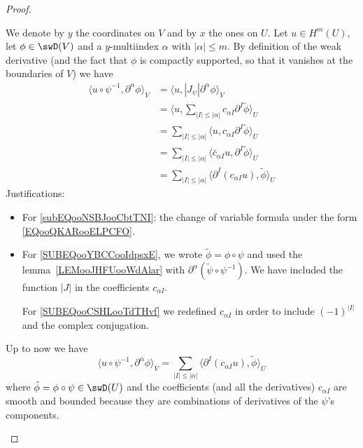 \begin{proof}
\begin{subproof}
		We denote by \( y\) the coordinates on \( V\) and by \( x\) the ones on \( U\). Let \( u\in H^m(U)\), let \( \phi\in\swD(V)\) and a \( y\)-multiindex \( \alpha\) with \( | \alpha |\leq m\). By definition of the weak derivative (and the fact that \( \phi\) is compactly supported, so that it vanishes at the boundaries of \( V\)) we have
		\begin{subequations}
			\begin{align}
				\langle u\circ\psi^{-1}, \partial^{\alpha}\phi\rangle_V & =\langle u, | J_{\psi}| \partial^{\alpha}\phi \rangle_V   \label{subEQooNSBJooCbtTNI}                                 \\
				                                                        & =\langle u, \sum_{| I |\leq | \alpha |}c_{\alpha I}\partial^I\tilde \phi\rangle_U  \label{SUBEQooYBCCooIdpsxE}        \\
				                                                        & =\sum_{ |I|\leq |\alpha|}\langle u, c_{\alpha I}\partial^{ I}\tilde\phi\rangle_U                                      \\
				                                                        & =\sum_{ |I|\leq |\alpha|}\langle \bar c_{\alpha I}u, \partial^{ I}\tilde \phi\rangle_U                                \\
				                                                        & =\sum_{ |I|\leq |\alpha|}\langle \partial^{ I}(c_{\alpha I}u), \tilde \phi\rangle_U       \label{SUBEQooCSHLooTdTHvf}
			\end{align}
		\end{subequations}
		Justifications:
		\begin{itemize}
			\item
			      For \eqref{subEQooNSBJooCbtTNI}: the change of variable formula under the form \eqref{EQooQKARooELPCFO}.
			\item
			      For \eqref{SUBEQooYBCCooIdpsxE}, we wrote \( \tilde \phi=\phi\circ\psi\) and used the lemma~\ref{LEMooJHFUooWdAlar} with \( \partial^{\alpha}(\tilde \psi\circ\psi^{-1})\). We have included the function \( | J |\) in the coefficients \( c_{\alpha I}\).

			      \spitem
			      For \eqref{SUBEQooCSHLooTdTHvf} we redefined \( c_{\alpha I}\) in order to include \( (-1)^{|  I |}\) and the complex conjugation.

		\end{itemize}

		Up to now we have
		\begin{equation}
			\langle u\circ\psi^{-1}, \partial^{\alpha}\phi\rangle_V =  \sum_{| I |\leq | \alpha |}\langle \partial^{I}(c_{\alpha I}u), \tilde \phi\rangle_U
		\end{equation}
		where \( \tilde \phi=\phi\circ\psi\in \swD(U)\) and the coefficients (and all the derivatives) \( c_{\alpha I}\) are smooth and bounded because they are combinations of derivatives of the \( \psi\)'s components.


\end{subproof}
\end{proof}
